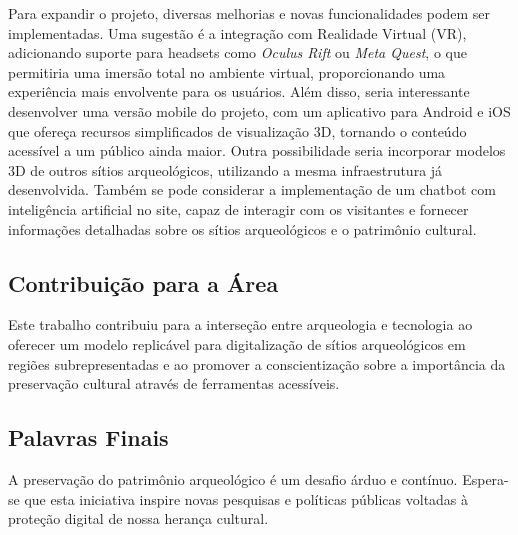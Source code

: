 Para expandir o projeto, diversas melhorias e novas funcionalidades podem ser implementadas. Uma sugestão é a integração com Realidade Virtual (VR), adicionando suporte para headsets como \textit{Oculus Rift} ou \textit{Meta Quest}, o que permitiria uma imersão total no ambiente virtual, proporcionando uma experiência mais envolvente para os usuários. Além disso, seria interessante desenvolver uma versão mobile do projeto, com um aplicativo para Android e iOS que ofereça recursos simplificados de visualização 3D, tornando o conteúdo acessível a um público ainda maior.
Outra possibilidade seria incorporar modelos 3D de outros sítios arqueológicos, utilizando a mesma infraestrutura já desenvolvida. Também se pode considerar a implementação de um chatbot com inteligência artificial no site, capaz de interagir com os visitantes e fornecer informações detalhadas sobre os sítios arqueológicos e o patrimônio cultural.


\subsection{Contribuição para a Área}
Este trabalho contribuiu para a interseção entre arqueologia e tecnologia ao oferecer um modelo replicável para digitalização de sítios arqueológicos em regiões subrepresentadas e ao promover a conscientização sobre a importância da preservação cultural através de ferramentas acessíveis.

\subsection{Palavras Finais}
A preservação do patrimônio arqueológico é um desafio árduo e contínuo. Espera-se que esta iniciativa inspire novas pesquisas e políticas públicas voltadas à proteção digital de nossa herança cultural. 